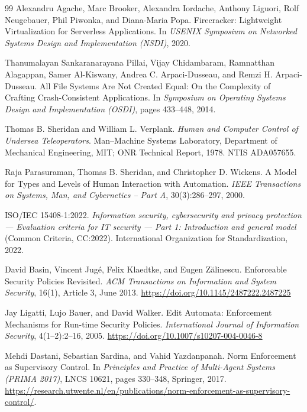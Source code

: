 \documentclass[11pt,a4paper]{article}
\theoremstyle{definition}
\theoremstyle{remark}
\begin{document}
\begin{thebibliography}{99}
Alexandru Agache, Marc Brooker, Alexandra Iordache, Anthony Liguori, Rolf Neugebauer, Phil Piwonka, and Diana-Maria Popa.
\newblock Firecracker: Lightweight Virtualization for Serverless Applications.
\newblock In \textit{USENIX Symposium on Networked Systems Design and Implementation (NSDI)}, 2020.

Thanumalayan Sankaranarayana Pillai, Vijay Chidambaram, Ramnatthan Alagappan, Samer Al-Kiswany, Andrea C. Arpaci-Dusseau, and Remzi H. Arpaci-Dusseau.
\newblock All File Systems Are Not Created Equal: On the Complexity of Crafting Crash-Consistent Applications.
\newblock In \textit{Symposium on Operating Systems Design and Implementation (OSDI)}, pages 433--448, 2014.

Thomas B. Sheridan and William L. Verplank.
\newblock \textit{Human and Computer Control of Undersea Teleoperators}.
\newblock Man--Machine Systems Laboratory, Department of Mechanical Engineering, MIT;
ONR Technical Report, 1978. NTIS ADA057655.

Raja Parasuraman, Thomas B. Sheridan, and Christopher D. Wickens.
\newblock A Model for Types and Levels of Human Interaction with Automation.
\newblock \textit{IEEE Transactions on Systems, Man, and Cybernetics -- Part A}, 30(3):286--297, 2000.

ISO/IEC 15408-1:2022.
\newblock \textit{Information security, cybersecurity and privacy protection --- Evaluation
criteria for IT security --- Part 1: Introduction and general model} (Common Criteria, CC:2022).
\newblock International Organization for Standardization, 2022.

David Basin, Vincent Jugé, Felix Klaedtke, and Eugen Zălinescu.
\newblock Enforceable Security Policies Revisited.
\newblock \textit{ACM Transactions on Information and System Security}, 16(1), Article 3, June 2013.
\newblock \url{https://doi.org/10.1145/2487222.2487225}

Jay Ligatti, Lujo Bauer, and David Walker.
\newblock Edit Automata: Enforcement Mechanisms for Run-time Security Policies.
\newblock \textit{International Journal of Information Security}, 4(1--2):2--16, 2005.
\newblock \url{https://doi.org/10.1007/s10207-004-0046-8}

Mehdi Dastani, Sebastian Sardina, and Vahid Yazdanpanah.
\newblock Norm Enforcement as Supervisory Control.
\newblock In \textit{Principles and Practice of Multi-Agent Systems (PRIMA 2017)}, LNCS 10621, pages 330--348, Springer, 2017.
\newblock \url{https://research.utwente.nl/en/publications/norm-enforcement-as-supervisory-control/}.


\end{thebibliography}
\end{document}
